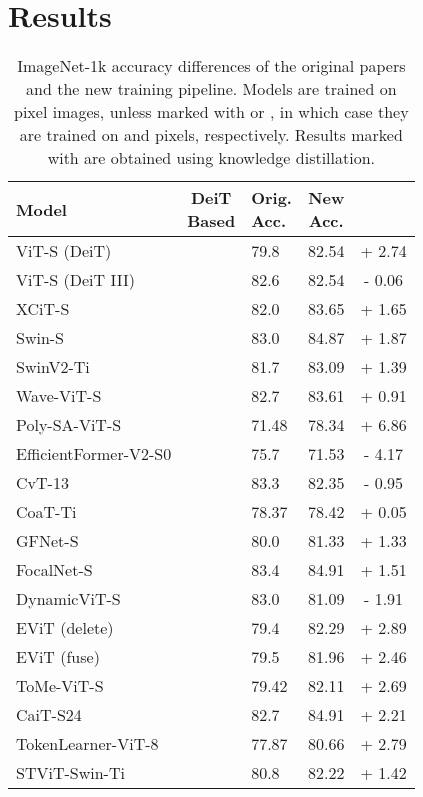 
\section{Results}


\begin{table}
	\small
	\centering
	\begin{tabular}{l|cl|cc}
		Model & \makecell[c]{DeiT \\ Based} & \makecell[c]{Orig. \\ Acc.} & \makecell[c]{New \\ Acc.} & \makecell[c]{}\\
		\hline
		ViT-S (DeiT)            & \checkmark & 79.8  & 82.54 & + 2.74 \\
		ViT-S (DeiT III)        &            & 82.6  & 82.54 & - 0.06 \\
		XCiT-S                  & \checkmark & 82.0  & 83.65 & + 1.65 \\
		Swin-S                  & \checkmark & 83.0  & 84.87 & + 1.87 \\
		SwinV2-Ti               &            & 81.7  & 83.09 & + 1.39 \\
		Wave-ViT-S              &            & 82.7  & 83.61 & + 0.91 \\
		Poly-SA-ViT-S           &            & 71.48 & 78.34 & + 6.86 \\
		EfficientFormer-V2-S0   &            & 75.7 & 71.53 & - 4.17 \\
		CvT-13                  &            & 83.3 & 82.35 &- 0.95\\
		CoaT-Ti                 & \checkmark & 78.37 &  78.42  & + 0.05 \\
		GFNet-S                 &            & 80.0  & 81.33 & + 1.33 \\
		FocalNet-S              &            & 83.4  & 84.91 & + 1.51 \\
		DynamicViT-S            &            & 83.0 & 81.09 & - 1.91 \\
		EViT (delete)           & \checkmark & 79.4  & 82.29 & + 2.89 \\
		EViT (fuse)             & \checkmark & 79.5  & 81.96 & + 2.46 \\
		ToMe-ViT-S              & \checkmark & 79.42 & 82.11 & + 2.69 \\
		CaiT-S24                & \checkmark & 82.7  & 84.91 & + 2.21 \\
		TokenLearner-ViT-8      &            & 77.87 & 80.66 & + 2.79 \\
		STViT-Swin-Ti           & \checkmark & 80.8  & 82.22 & + 1.42 \\
	\end{tabular}
	\caption{ImageNet-1k accuracy differences of the original papers and the new training pipeline. 
		Models are trained on  pixel images, unless marked with  or , in which case they are trained on  and  pixels, respectively. Results marked with  are obtained using knowledge distillation.}
	\label{table:pipeline_comparisons}
\end{table}

